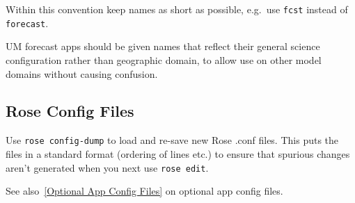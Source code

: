 Within this convention keep names as short as possible, e.g.\ use
\lstinline=fcst= instead of \lstinline=forecast=.

UM forecast apps should be given names that reflect their general science
configuration rather than geographic domain, to allow use on other model
domains without causing confusion.

\subsection{Rose Config Files}

Use \lstinline=rose config-dump= to load and re-save new Rose .conf files. This
puts the files in a standard format (ordering of lines etc.) to ensure that
spurious changes aren't generated when you next use \lstinline=rose edit=.

See also~\ref{Optional App Config Files} on optional app config files.
